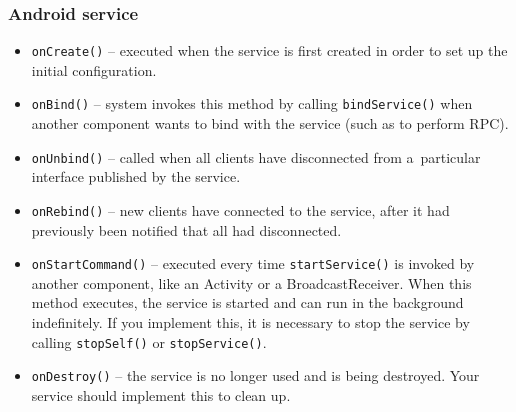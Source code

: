 \documentclass[10pt,xcolor=pdflatex]{beamer}
\begin{document}
\begin{frame}\frametitle{Android service}
  \begin{itemize}
    \item \texttt{onCreate()} -- {\footnotesize executed when the service is first created in order to set up the initial configuration.}
    \item \texttt{onBind()} -- {\footnotesize system invokes this method by calling \texttt{bindService()} when another component wants to bind with the service (such as to perform RPC).}
    \item \texttt{onUnbind()} -- {\footnotesize called when all clients have disconnected from a~particular interface published by the service.}
    \item \texttt{onRebind()} -- {\footnotesize new clients have connected to the service, after it had previously been notified that all had disconnected.}
    \item \texttt{onStartCommand()} -- {\footnotesize executed every time \texttt{startService()} is invoked by another component, like an Activity or a BroadcastReceiver. When this method executes, the service is started and can run in the background indefinitely. If you implement this, it is necessary to stop the service by calling \texttt{stopSelf()} or \texttt{stopService()}.}
    \item \texttt{onDestroy()} -- {\footnotesize the service is no longer used and is being destroyed. Your service should implement this to clean up.}
  \end{itemize}
\end{frame}
\end{document}
